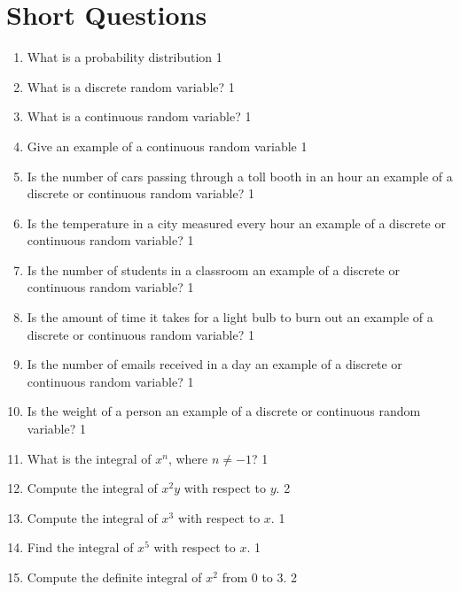 \documentclass[a4paper,oneside, margin=1.4in]{book}
\begin{document}
\section{Short Questions}

  \begin{enumerate}

\item What is a probability distribution \hfill 1
\item What is a discrete random variable? \hfill 1

\item What is a continuous random variable? \hfill 1

\item Give an example of a continuous random variable \hfill 1

\item Is the number of cars passing through a toll booth in an hour an example of a discrete or continuous random variable? \hfill 1

\item Is the temperature in a city measured every hour an example of a discrete or continuous random variable? \hfill 1

\item Is the number of students in a classroom an example of a discrete or continuous random variable? \hfill 1

\item Is the amount of time it takes for a light bulb to burn out an example of a discrete or continuous random variable? \hfill 1

\item Is the number of emails received in a day an example of a discrete or continuous random variable? \hfill 1

\item Is the weight of a person an example of a discrete or continuous random variable? \hfill 1

\item What is the integral of \( x^n \), where \( n \neq -1 \)? \hfill 1
\item Compute the integral of \( x^2y \) with respect to \( y \). \hfill 2
\item Compute the integral of \( x^3 \) with respect to \( x \). \hfill 1

\item Find the integral of \( x^5 \) with respect to \( x \). \hfill 1

\item Compute the definite integral of \( x^2 \) from 0 to 3. \hfill 2


\end{enumerate}
\end{document}
